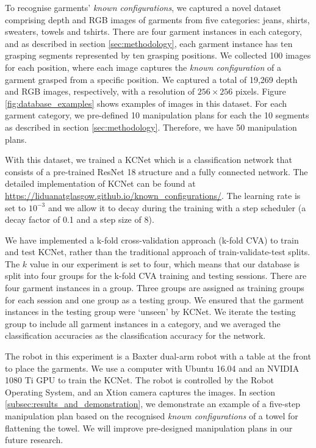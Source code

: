 \documentclass[conference]{IEEEtran}
\begin{document}
To recognise garments' \textit{known configurations}, we captured a novel dataset comprising depth and RGB images of garments from five categories: jeans, shirts, sweaters, towels and tshirts. There are four garment instances in each category, and as described in section \ref{sec:methodology}, each garment instance has ten grasping segments represented by ten grasping positions. We collected 100 images for each position, where each image captures the \textit{known configuration} of a garment grasped from a specific position. We captured a total of 19,269 depth and RGB images, respectively, with a resolution of $256\times 256$ pixels. Figure \ref{fig:database_examples} shows examples of images in this dataset. For each garment category, we pre-defined 10 manipulation plans for each the 10 segments as described in section \ref{sec:methodology}. Therefore, we have 50 manipulation plans.

With this dataset, we trained a KCNet which is a classification network that consists of a pre-trained ResNet 18 structure and a fully connected network. The detailed implementation of KCNet can be found at \url{https://liduanatglasgow.github.io/known_configurations/}. The learning rate is set to $10^{-3}$ and we allow it to decay during the training with a step scheduler (a decay factor of 0.1 and a step size of 8). 

We have implemented a k-fold cross-validation approach (k-fold CVA) to train and test KCNet, rather than the traditional approach of train-validate-test splits. The $k$ value in our experiment is set to four, which means that our database is split into four groups for the k-fold CVA training and testing sessions. There are four garment instances in a group. Three groups are assigned as training groups for each session and one group as a testing group. We ensured that the garment instances in the testing group were ‘unseen’ by KCNet. We iterate the testing group to include all garment instances in a category, and we averaged the classification accuracies as the classification accuracy for the network.

The robot in this experiment is a Baxter dual-arm robot with a table at the front to place the garments. We use a computer with Ubuntu 16.04 and an NVIDIA 1080 Ti GPU to train the KCNet. The robot is controlled by the Robot Operating System, and an Xtion camera captures the images. In section \ref{subsec:results_and_demonstration}, we demonstrate an example of a five-step manipulation plan based on the recognised \textit{known configurations} of a towel for flattening the towel. We will improve pre-designed manipulation plans in our future research.
\end{document}
